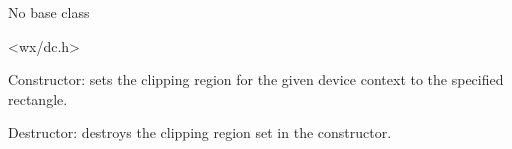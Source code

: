 
No base class


<wx/dc.h>





\label{wxdcclipperctor}



Constructor: sets the clipping region for the given device context to the
specified rectangle.


\label{wxdcclipperdtor}


Destructor: destroys the clipping region set in the constructor.

